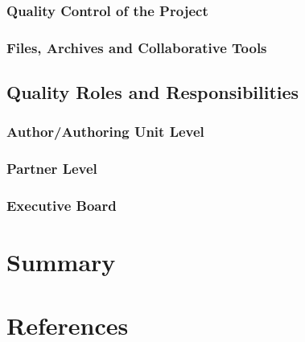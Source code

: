 \documentclass[
  11pt,
]{article}
\begin{document}
\hypertarget{quality-control-of-the-project}{%
\subsubsection{Quality Control of the
Project}\label{quality-control-of-the-project}}

\hypertarget{files-archives-and-collaborative-tools}{%
\subsubsection{Files, Archives and Collaborative
Tools}\label{files-archives-and-collaborative-tools}}

\hypertarget{quality-roles-and-responsibilities}{%
\subsection{Quality Roles and
Responsibilities}\label{quality-roles-and-responsibilities}}

\hypertarget{authorauthoring-unit-level}{%
\subsubsection{Author/Authoring Unit
Level}\label{authorauthoring-unit-level}}

\hypertarget{partner-level}{%
\subsubsection{Partner Level}\label{partner-level}}

\hypertarget{executive-board}{%
\subsubsection{Executive Board}\label{executive-board}}

\clearpage

\hypertarget{summary}{%
\section{Summary}\label{summary}}

\clearpage

\hypertarget{references}{%
\section*{References}\label{references}}
\end{document}

